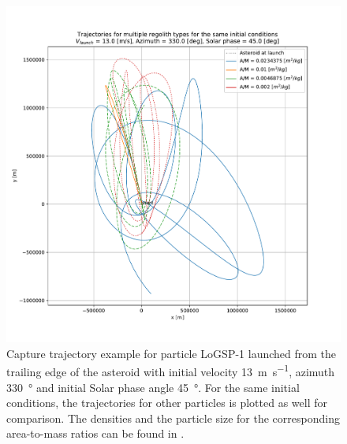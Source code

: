 \begin{figure}[htb]
\centering
\captionsetup{justification=centering}
\includegraphics[width=\textwidth, height=0.6\textheight, keepaspectratio=true]{trailing_edge_perturbations/capture_traj_logsp1_13ms_330azim_45solarPhase.pdf}
\caption{Capture trajectory example for particle LoGSP-1 launched from the trailing edge of the asteroid with initial velocity \SI{13}{\metre\per\second}, azimuth \SI{330}{\degree} and initial Solar phase angle \SI{45}{\degree}. For the same initial conditions, the trajectories for other particles is plotted as well for comparison. The densities and the particle size for the corresponding area-to-mass ratios can be found in .}
\label{fig:trailing_edge_capture_example_logsp1}
\end{figure}
\FloatBarrier
